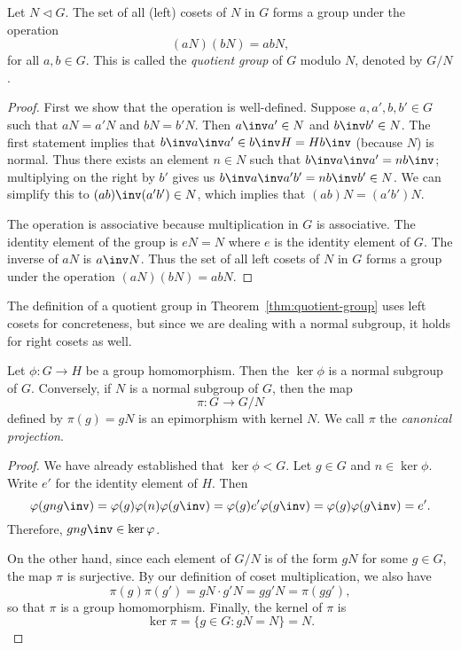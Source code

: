 \begin{theorem}
    \label{thm:quotient-group}
    Let \(N \triangleleft G\). The set of all (left) cosets of \(N\) in \(G\)
    forms a group under the operation
    \[
        (aN)(bN) = abN,
    \]
    for all \(a, b \in G\). This is called the \emph{quotient group} of \(G\)
    modulo \(N\), denoted by \(G/N\).
\end{theorem}

\begin{proof}
    First we show that the operation is well-defined. Suppose \(a, a', b, b' \in
    G\) such that \(aN = a'N\) and \(bN = b'N\). Then \(a\inv a' \in N\) and
    \(b\inv b' \in N\). The first statement implies that \(b\inv a\inv a' \in
    b\inv H = Hb\inv\) (because \(N\)) is normal. Thus there exists an element
    \(n \in N\) such that \(b\inv a\inv a' = nb\inv\); multiplying on the right
    by \(b'\) gives us \(b\inv a\inv a'b' = nb\inv b' \in N\). We can simplify
    this to \((ab)\inv(a'b') \in N\), which implies that \((ab)N = (a'b')N\).

    The operation is associative because multiplication in \(G\) is associative.
    The identity element of the group is \(eN = N\) where \(e\) is the identity
    element of \(G\). The inverse of \(aN\) is \(a\inv N\). Thus the set of all
    left cosets of \(N\) in \(G\) forms a group under the operation \((aN)(bN) =
    abN\).
\end{proof}

\begin{remark}
    The definition of a quotient group in Theorem~\ref{thm:quotient-group} uses
    left cosets for concreteness, but since we are dealing with a normal
    subgroup, it holds for right cosets as well.
\end{remark}

\begin{theorem}
    Let \(\phi : G \to H\) be a group homomorphism. Then the \(\ker \phi\) is a
    normal subgroup of \(G\). Conversely, if \(N\) is a normal subgroup of
    \(G\), then the map
    \[
        \pi : G \to G/N
    \]
    defined by \(\pi(g) = gN\) is an epimorphism with kernel \(N\). We call
    \(\pi\) the \emph{canonical projection}.
\end{theorem}

\begin{proof}
    We have already established that \(\ker \phi < G\). Let \(g \in G\) and \(n
    \in \ker \phi\). Write \(e'\) for the identity element of \(H\). Then
    \[
        \phi(gng\inv) = \phi(g)\phi(n)\phi(g\inv) = \phi(g)e'\phi(g\inv) = \phi(g)\phi(g\inv) = e'.
    \]
    Therefore, \(gng\inv \in \ker \phi\).

    On the other hand, since each element of \(G/N\) is of the form \(gN\) for
    some \(g \in G\), the map \(\pi\) is surjective. By our definition of coset
    multiplication, we also have
    \[
        \pi(g)\pi(g') = gN \cdot g'N = gg'N = \pi(gg'),
    \]
    so that \(\pi\) is a group homomorphism. Finally, the kernel of \(\pi\) is
    \[
        \ker \pi = \{g \in G : gN = N\} = N.
    \]
\end{proof}

